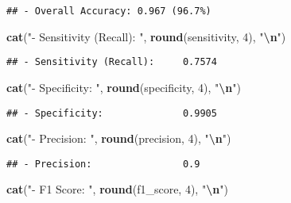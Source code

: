 \documentclass[
]{article}
\newenvironment{Shaded}{\begin{snugshade}}{\end{snugshade}}
\newcommand{\DecValTok}[1]{\textcolor[rgb]{0.00,0.00,0.81}{#1}}
\newcommand{\FunctionTok}[1]{\textcolor[rgb]{0.13,0.29,0.53}{\textbf{#1}}}
\newcommand{\NormalTok}[1]{#1}
\newcommand{\SpecialCharTok}[1]{\textcolor[rgb]{0.81,0.36,0.00}{\textbf{#1}}}
\newcommand{\StringTok}[1]{\textcolor[rgb]{0.31,0.60,0.02}{#1}}
\begin{document}
\begin{verbatim}
## - Overall Accuracy: 0.967 (96.7%)
\end{verbatim}

\begin{Shaded}
\begin{Highlighting}[]
\FunctionTok{cat}\NormalTok{(}\StringTok{"{-} Sensitivity (Recall):    "}\NormalTok{, }\FunctionTok{round}\NormalTok{(sensitivity, }\DecValTok{4}\NormalTok{), }\StringTok{"}\SpecialCharTok{\textbackslash{}n}\StringTok{"}\NormalTok{)}
\end{Highlighting}
\end{Shaded}

\begin{verbatim}
## - Sensitivity (Recall):     0.7574
\end{verbatim}

\begin{Shaded}
\begin{Highlighting}[]
\FunctionTok{cat}\NormalTok{(}\StringTok{"{-} Specificity:             "}\NormalTok{, }\FunctionTok{round}\NormalTok{(specificity, }\DecValTok{4}\NormalTok{), }\StringTok{"}\SpecialCharTok{\textbackslash{}n}\StringTok{"}\NormalTok{)}
\end{Highlighting}
\end{Shaded}

\begin{verbatim}
## - Specificity:              0.9905
\end{verbatim}

\begin{Shaded}
\begin{Highlighting}[]
\FunctionTok{cat}\NormalTok{(}\StringTok{"{-} Precision:               "}\NormalTok{, }\FunctionTok{round}\NormalTok{(precision, }\DecValTok{4}\NormalTok{), }\StringTok{"}\SpecialCharTok{\textbackslash{}n}\StringTok{"}\NormalTok{)}
\end{Highlighting}
\end{Shaded}

\begin{verbatim}
## - Precision:                0.9
\end{verbatim}

\begin{Shaded}
\begin{Highlighting}[]
\FunctionTok{cat}\NormalTok{(}\StringTok{"{-} F1 Score:                "}\NormalTok{, }\FunctionTok{round}\NormalTok{(f1\_score, }\DecValTok{4}\NormalTok{), }\StringTok{"}\SpecialCharTok{\textbackslash{}n}\StringTok{"}\NormalTok{)}
\end{Highlighting}
\end{Shaded}
\end{document}
